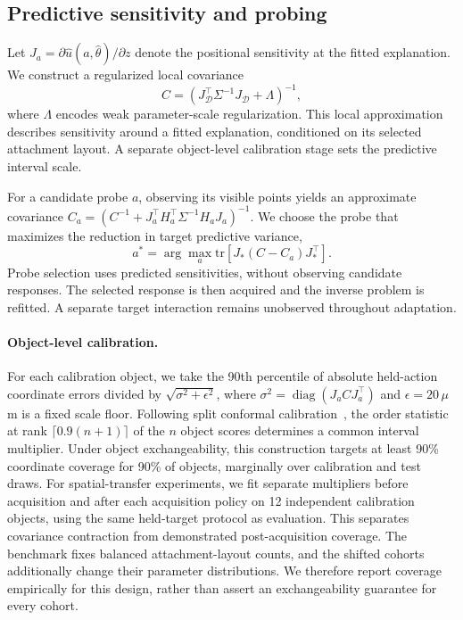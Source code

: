 \documentclass[10pt,twocolumn,letterpaper]{article}
\begin{document}
\subsection{Predictive sensitivity and probing}
Let $J_a=\partial \hat u(a,\hat\theta)/\partial z$ denote the positional sensitivity at the fitted explanation. We construct a regularized local covariance
\begin{equation}
 C=\left(J_{\mathcal D}^{\top}\Sigma^{-1}J_{\mathcal D}+\Lambda\right)^{-1},
\end{equation}
where $\Lambda$ encodes weak parameter-scale regularization. This local approximation describes sensitivity around a fitted explanation, conditioned on its selected attachment layout. A separate object-level calibration stage sets the predictive interval scale.

For a candidate probe $a$, observing its visible points yields an approximate covariance $C_a=(C^{-1}+J_a^{\top}H_a^{\top}\Sigma^{-1}H_aJ_a)^{-1}$. We choose the probe that maximizes the reduction in target predictive variance,
\begin{equation}
 a^*=\arg\max_a\mathrm{tr}\!\left[J_*\left(C-C_a\right)J_*^{\top}\right].
\end{equation}
Probe selection uses predicted sensitivities, without observing candidate responses. The selected response is then acquired and the inverse problem is refitted. A separate target interaction remains unobserved throughout adaptation.

\paragraph{Object-level calibration.}
For each calibration object, we take the 90th percentile of absolute held-action coordinate errors divided by $\sqrt{\sigma^2+\epsilon^2}$, where $\sigma^2=\operatorname{diag}(J_aCJ_a^\top)$ and $\epsilon=20\,\mu$m is a fixed scale floor. Following split conformal calibration~\cite{angelopoulos2021conformal}, the order statistic at rank $\lceil0.9(n+1)\rceil$ of the $n$ object scores determines a common interval multiplier. Under object exchangeability, this construction targets at least 90\% coordinate coverage for 90\% of objects, marginally over calibration and test draws. For spatial-transfer experiments, we fit separate multipliers before acquisition and after each acquisition policy on 12 independent calibration objects, using the same held-target protocol as evaluation. This separates covariance contraction from demonstrated post-acquisition coverage. The benchmark fixes balanced attachment-layout counts, and the shifted cohorts additionally change their parameter distributions. We therefore report coverage empirically for this design, rather than assert an exchangeability guarantee for every cohort.
\end{document}

